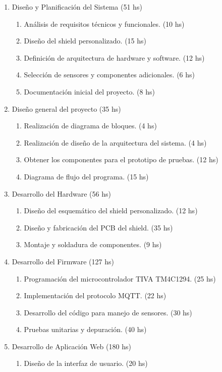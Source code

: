 \documentclass[
11pt, %
]{charter}
\begin{document}
\begin{enumerate}
\item Diseño y Planificación del Sistema (51 hs)
	\begin{enumerate}
	\item Análisis de requisitos técnicos y funcionales. (10 hs)
	\item Diseño del shield personalizado. (15 hs) 
	\item Definición de arquitectura de hardware y software. (12 hs)
	\item Selección de sensores y componentes adicionales. (6 hs)
	\item Documentación inicial del proyecto. (8 hs)
	\end{enumerate}
\item Diseño general del proyecto (35 hs)
	\begin{enumerate}
	\item Realización de diagrama de bloques. (4 hs)
	\item Realización de diseño de la arquitectura del sistema. (4 hs)
	\item Obtener los componentes para el prototipo de pruebas. (12 hs)
	\item Diagrama de flujo del programa. (15 hs)
	\end{enumerate}
\item Desarrollo del Hardware (56 hs)
	\begin{enumerate}
	\item Diseño del esquemático del shield personalizado. (12 hs)
	\item Diseño y fabricación del PCB del shield. (35 hs)
	\item Montaje y soldadura de componentes. (9 hs)
	\end{enumerate}
\item Desarrollo del Firmware (127 hs)
	\begin{enumerate}
	\item Programación del microcontrolador TIVA TM4C1294. (25 hs)
	\item Implementación del protocolo MQTT. (22 hs)
	\item Desarrollo del código para manejo de sensores. (30 hs)
	\item Pruebas unitarias y depuración. (40 hs)
	\end{enumerate}
\item Desarrollo de Aplicación Web (180 hs)
	\begin{enumerate}
	\item Diseño de la interfaz de usuario. (20 hs)

\end{enumerate}
\end{enumerate}
\end{document}
